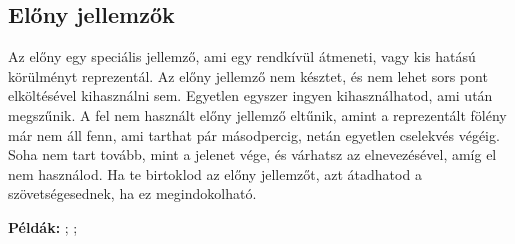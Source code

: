 \subsection{Előny jellemzők}

Az előny egy speciális jellemző, ami egy rendkívül átmeneti, vagy kis hatású körülményt reprezentál. Az előny jellemző nem késztet, és nem lehet sors pont elköltésével kihasználni sem. Egyetlen egyszer ingyen kihasználhatod, ami után megszűnik. A fel nem használt előny jellemző eltűnik, amint a reprezentált fölény már nem áll fenn, ami tarthat pár másodpercig, netán egyetlen cselekvés végéig. Soha nem tart tovább, mint a jelenet vége, és várhatsz az elnevezésével, amíg el nem használod. Ha te birtoklod az előny jellemzőt, azt átadhatod a szövetségesednek, ha ez megindokolható.

\textbf{Példák:} ; ; 
